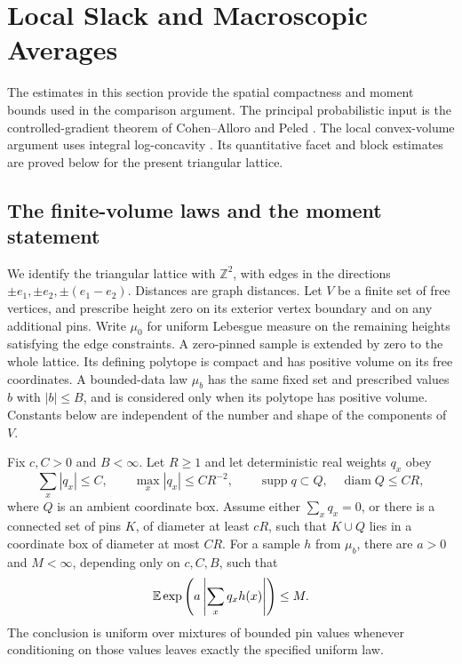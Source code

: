 \section{Local Slack and Macroscopic Averages}\label{f:section}
The estimates in this section provide the spatial compactness and moment
bounds used in the comparison argument. The principal probabilistic input
is the controlled-gradient theorem of Cohen--Alloro and Peled \cite{CAP}.
The local convex-volume argument uses integral log-concavity
\cite[Theorems 3 and 6]{Prekopa}. Its quantitative facet and block
estimates are proved below for the present triangular lattice.

\subsection{The finite-volume laws and the moment statement}
We identify the triangular lattice with $\mathbb Z^2$, with edges in the
directions $\pm e_1,\pm e_2,\pm(e_1-e_2)$. Distances are graph distances.
Let $V$ be a finite set of free vertices, and prescribe height zero on its
exterior vertex boundary and on any additional pins. Write $\mu_0$ for
uniform Lebesgue measure on the remaining heights satisfying the edge
constraints. A zero-pinned sample is extended by zero to the whole lattice.
Its defining polytope is compact and has positive volume on its free
coordinates. A bounded-data law $\mu_b$ has the same fixed set and prescribed
values $b$ with $|b|\le B$, and is considered only when its polytope has
positive volume. Constants below are independent of the number and shape
of the components of $V$.

\begin{proposition}\label{f:averages}
Fix $c,C>0$ and $B<\infty$. Let $R\ge1$ and let deterministic real weights
$q_x$ obey
\begin{equation}\label{f:weights}
 \sum_x|q_x|\le C,\qquad \max_x|q_x|\le CR^{-2},\qquad
 \operatorname{supp}q\subset Q,
 \quad \operatorname{diam}Q\le CR,
\end{equation}
where $Q$ is an ambient coordinate box. Assume either $\sum_xq_x=0$, or
there is a connected set of pins $K$, of diameter at least $cR$, such that
$K\cup Q$ lies in a coordinate box of diameter at most $CR$. For a sample
$h$ from $\mu_b$, there are $a>0$ and $M<\infty$, depending only on
$c,C,B$, such that
\begin{equation}\label{f:average-mgf}
 \mathbb E\exp\left(a\left|\sum_xq_xh(x)\right|\right)\le M.
\end{equation}
The conclusion is uniform over mixtures of bounded pin values whenever
conditioning on those values leaves exactly the specified uniform law.
\end{proposition}

